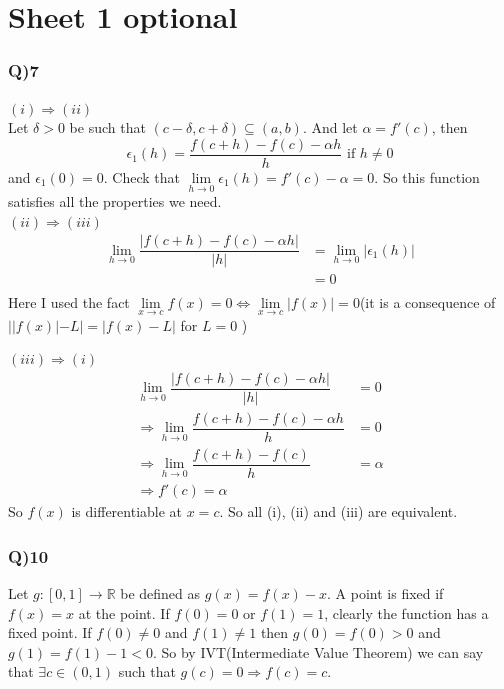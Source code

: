 \documentclass[11pt]{beamer}
\begin{document}
\section{Sheet 1 optional}
\begin{frame}
\frametitle{Q)7}
$(i)\Rightarrow (ii)$\\
Let $\delta>0$ be such that $(c-\delta,c+\delta) \subseteq (a,b)$. And let $\alpha =f'(c)$, then 
$$\epsilon_1(h)=\dfrac{f(c+h)-f(c)-\alpha h}{h}\text{ if }h\neq 0$$
and $\epsilon_1(0)=0$. Check that $\underset{h \to 0}{\lim}\epsilon_1(h)=f'(c)-\alpha=0$. So this function satisfies all the properties we need.\\
$(ii)\Rightarrow (iii)$\\
\begin{align*}
\underset{h \to 0}{\lim}\dfrac{|f(c+h)-f(c)-\alpha h|}{|h|}&=\underset{h \to 0}{\lim}|\epsilon_1(h)|\\
&=0\\
\end{align*}
Here I used the fact $\underset{x \to c}{\lim}f(x)=0 \Leftrightarrow\underset{x \to c}{\lim}|f(x)|=0$(it is a consequence of $||f(x)|-L|=|f(x)-L|$ for $L=0$ )
\end{frame}
\begin{frame}
$(iii) \Rightarrow (i)$
\begin{align*}
\underset{h \to 0}{\lim}\dfrac{|f(c+h)-f(c)-\alpha h|}{|h|}&=0\\
\Rightarrow \underset{h \to 0}{\lim}\dfrac{f(c+h)-f(c)-\alpha h}{h}&=0\\
\Rightarrow \underset{h \to 0}{\lim}\dfrac{f(c+h)-f(c)}{h}&=\alpha\\
\Rightarrow f'(c)=\alpha
\end{align*}
So $f(x)$ is differentiable at $x=c$.
So all (i), (ii) and (iii) are equivalent.
\end{frame}
\begin{frame}
\frametitle{Q)10}
Let $g:[0,1]\rightarrow \mathbb{R}$ be defined as $g(x)=f(x)-x$. A point is fixed if $f(x)=x$ at the point. If $f(0)=0$ or $f(1)=1$, clearly the function has a fixed point. If $f(0)\neq 0$ and $f(1)\neq 1$ then $g(0)=f(0)>0$ and $g(1)=f(1)-1<0$. So by IVT(Intermediate Value Theorem) we can say that $\exists c\in (0,1)$ such that $g(c)=0\Rightarrow f(c)=c$.
\end{frame}
\end{document}
